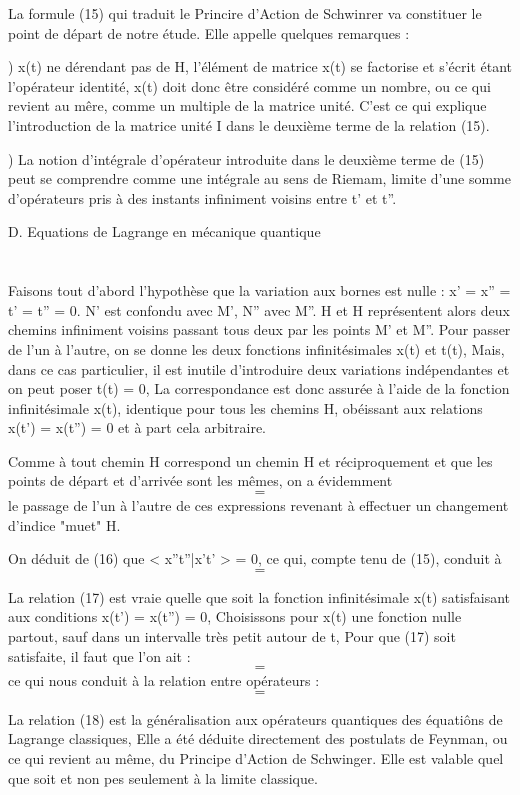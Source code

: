 La formule (15) qui traduit le Princire d'Action de Schwinrer
va constituer le point de départ de notre étude. Elle appelle quelques
remarques :

) x(t) ne dérendant pas de H, l'élément de matrice x(t)
se factorise et s'écrit  étant l'opérateur identité,
x(t) doit donc être considéré comme un nombre, ou ce qui revient au mêre,
comme un multiple de la matrice unité. C'est ce qui explique l'introduction
de la matrice unité I dans le deuxième terme de la relation (15).

) La notion d'intégrale d'opérateur introduite dans le deuxième terme de
(15) peut se comprendre comme une intégrale au sens de Riemam, limite d'une
somme d'opérateurs pris à des instants infiniment voisins entre t' et t''.

D. Equations de Lagrange en mécanique quantique
\section{}
Faisons tout d'abord l'hypothèse que la variation aux bornes est
nulle : x' = x'' = t' = t'' = 0. N' est confondu avec M', N'' avec M''.
H et H représentent alors deux chemins infiniment voisins passant tous
deux par les points M' et M''. Pour passer de l'un à l'autre, on se donne
les deux fonctions infinitésimales x(t) et t(t), Mais, dans ce cas particulier, il est inutile d'introduire deux variations indépendantes et on peut
poser t(t) = 0, La correspondance est donc assurée à l'aide de la fonction
infinitésimale x(t), identique pour tous les chemins H, obéissant aux relations x(t') = x(t'') = 0 et à part cela arbitraire.

Comme à tout chemin H correspond un chemin H et réciproquement
et que les points de départ et d'arrivée sont les mêmes, on a évidemment
\[
\tag{16}=
\]
le passage de l'un à l'autre de ces expressions revenant à effectuer un
changement d'indice "muet" H.

On déduit de (16) que  < x''t''|x't' > = 0, ce qui, compte tenu
de (15), conduit à
\[
\tag{17}=
\]

La relation (17) est vraie quelle que soit la fonction infinitésimale x(t)
satisfaisant aux conditions x(t') = x(t'') = 0,
Choisissons pour x(t) une fonction nulle partout, sauf dans un intervalle
très petit autour de t, Pour que (17) soit satisfaite, il faut que l'on ait :
\[
=
\]
ce qui nous conduit à la relation entre opérateurs :
\[
\tag{18}=
\]

La relation (18) est la généralisation aux opérateurs quantiques
des équatiôns de Lagrange classiques, Elle a été déduite directement des
postulats de Feynman, ou ce qui revient au même, du Principe d'Action de
Schwinger. Elle est valable quel que soit  et non pes seulement à la
limite classique.

